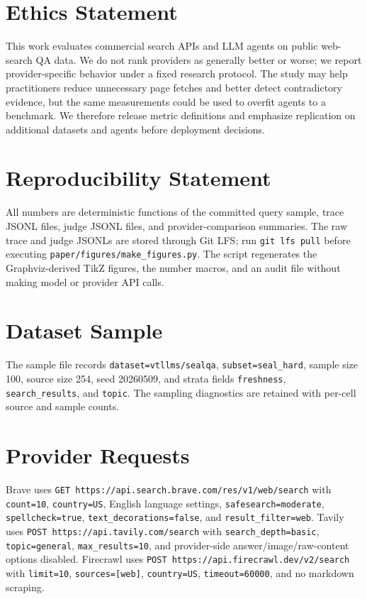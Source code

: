 \documentclass[11pt]{article}
\begin{document}
\section*{Ethics Statement}
This work evaluates commercial search APIs and LLM agents on public web-search QA data. We do not rank providers as generally better or worse; we report provider-specific behavior under a fixed research protocol. The study may help practitioners reduce unnecessary page fetches and better detect contradictory evidence, but the same measurements could be used to overfit agents to a benchmark. We therefore release metric definitions and emphasize replication on additional datasets and agents before deployment decisions.

\section*{Reproducibility Statement}
All numbers are deterministic functions of the committed query sample, trace JSONL files, judge JSONL files, and provider-comparison summaries. The raw trace and judge JSONLs are stored through Git LFS; run \texttt{git lfs pull} before executing \texttt{paper/figures/make\_figures.py}. The script regenerates the Graphviz-derived TikZ figures, the number macros, and an audit file without making model or provider API calls.




\appendix

\section{Dataset Sample}
\label{app:dataset}
The sample file records \texttt{dataset=vtllms/sealqa}, \texttt{subset=seal\_hard}, sample size 100, source size 254, seed 20260509, and strata fields \texttt{freshness}, \texttt{search\_results}, and \texttt{topic}. The sampling diagnostics are retained with per-cell source and sample counts.

\section{Provider Requests}
\label{app:provider-requests}
Brave uses \texttt{GET https://api.search.brave.com/res/v1/web/search} with \texttt{count=10}, \texttt{country=US}, English language settings, \texttt{safesearch=moderate}, \texttt{spellcheck=true}, \texttt{text\_decorations=false}, and \texttt{result\_filter=web}. Tavily uses \texttt{POST https://api.tavily.com/search} with \texttt{search\_depth=basic}, \texttt{topic=general}, \texttt{max\_results=10}, and provider-side answer/image/raw-content options disabled. Firecrawl uses \texttt{POST https://api.firecrawl.dev/v2/search} with \texttt{limit=10}, \texttt{sources=[web]}, \texttt{country=US}, \texttt{timeout=60000}, and no markdown scraping.
\end{document}
